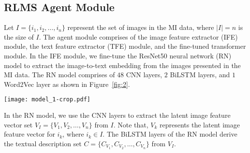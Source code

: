 \documentclass[preprint,review,12pt]{elsarticle}
\begin{document}
\begin{comment}
The RLMS approach consists of two modules, the agent module and the environment module. In Section ~\ref{sec:agent}, we present the mathematical model of the agent module. The functionality of the agent module is to generate the MO summary by exploring the semantic gap presented in the different modalities of the MI data. In this paper, we focus on MI data which consists of images and text data. Whereas, the functionality of the environment module is to reward the MO summary generated by the Agent module. If the reward is greater than the threshold ($\phi$), then the MO summary is given to the user. Else, the environment module retrains the agent module by updating the weights of the model based on the error ($\xi$).


In Section ~\ref{sec:environment}, we discuss the working ITS mechanism to rewarding the MO summary as part of the environment module. 




The ROUGE metric compares the context of the MO summary with the context of the MI data to generate the reward between the range $[0-1]$. We use the ITS mechanism for rewarding the MO summary obtained from the agent module as described in Section . The RLMS consists 3 main modules such as, image module, text module, and ITS module.

\end{comment}
	
\subsection {RLMS Agent Module}\label{sec:agent}

Let $I = \{i_1, i_2, \ldots, i_n\}$ represent the set of images in the MI data, where $|I| = n$ is the size of $I$. The agent module comprises of the image feature extractor (IFE) module, the text feature extractor (TFE) module, and the fine-tuned transformer module. In the IFE module, we fine-tune the ResNet50 neural network (RN) model to extract the image-to-text embedding from the images presented in the MI data. The RN model comprises of $48$ CNN layers, $2$ BiLSTM layers, and $1$ Word2Vec layer as shown in Figure~\ref{fig:2}. 
\begin{figure*}[h!]
	\centering
	\texttt{[image: model\_1-crop.pdf]}
	\caption{Image Feature Extractor (a.k.a. Fine-tuned ResNet50 approach).} 
	\label{fig:2}
\end{figure*}
In the RN model, we use the CNN layers to extract the latent image feature vector set $V_I = \{ V_1, V_2, \ldots, V_n\}$ from $I$. Note that, $V_k$ represents the latent image feature vector for $i_k$, where $i_k \in I$.  The BiLSTM layers of the RN model derive the textual description set $C = \{ C_{V_1}, C_{V_2}, \ldots, C_{V_n}\}$ from $V_I$. 
\end{document}
